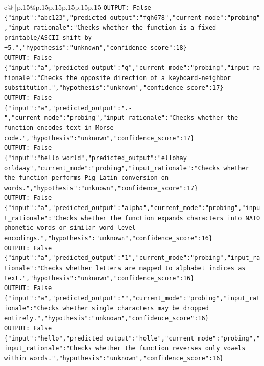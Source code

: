 \documentclass{article}
\begin{document}
{\begin{supertabular}{c@{$\;$}|p{.15\linewidth}@{}p{.15\linewidth}p{.15\linewidth}p{.15\linewidth}p{.15\linewidth}p{.15\linewidth}}
{{{\texttt{OUTPUT: False} \\
\texttt{\{"input":"abc123","predicted\_output":"fgh678","current\_mode":"probing","input\_rationale":"Checks whether the function is a fixed printable/ASCII shift by +5.","hypothesis":"unknown","confidence\_score":18\}} \\
\texttt{OUTPUT: False} \\
\texttt{\{"input":"a","predicted\_output":"q","current\_mode":"probing","input\_rationale":"Checks the opposite direction of a keyboard{-}neighbor substitution.","hypothesis":"unknown","confidence\_score":17\}} \\
\texttt{OUTPUT: False} \\
\texttt{\{"input":"a","predicted\_output":".{-}","current\_mode":"probing","input\_rationale":"Checks whether the function encodes text in Morse code.","hypothesis":"unknown","confidence\_score":17\}} \\
\texttt{OUTPUT: False} \\
\texttt{\{"input":"hello world","predicted\_output":"ellohay orldway","current\_mode":"probing","input\_rationale":"Checks whether the function performs Pig Latin conversion on words.","hypothesis":"unknown","confidence\_score":17\}} \\
\texttt{OUTPUT: False} \\
\texttt{\{"input":"a","predicted\_output":"alpha","current\_mode":"probing","input\_rationale":"Checks whether the function expands characters into NATO phonetic words or similar word{-}level encodings.","hypothesis":"unknown","confidence\_score":16\}} \\
\texttt{OUTPUT: False} \\
\texttt{\{"input":"a","predicted\_output":"1","current\_mode":"probing","input\_rationale":"Checks whether letters are mapped to alphabet indices as text.","hypothesis":"unknown","confidence\_score":16\}} \\
\texttt{OUTPUT: False} \\
\texttt{\{"input":"a","predicted\_output":"","current\_mode":"probing","input\_rationale":"Checks whether single characters may be dropped entirely.","hypothesis":"unknown","confidence\_score":16\}} \\
\texttt{OUTPUT: False} \\
\texttt{\{"input":"hello","predicted\_output":"holle","current\_mode":"probing","input\_rationale":"Checks whether the function reverses only vowels within words.","hypothesis":"unknown","confidence\_score":16\}} \\
}}}
\end{supertabular}}
\end{document}
